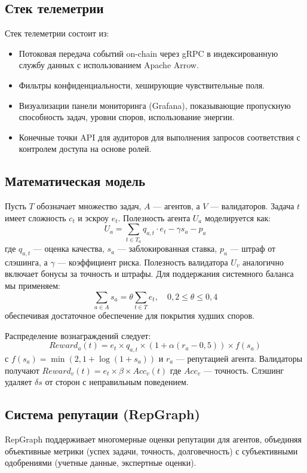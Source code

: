 \documentclass[11pt]{article}
\begin{document}
\subsection{Стек телеметрии}
Стек телеметрии состоит из:
\begin{itemize}[noitemsep]
  \item Потоковая передача событий on-chain через gRPC в индексированную службу данных с использованием Apache Arrow.
  \item Фильтры конфиденциальности, хеширующие чувствительные поля.
  \item Визуализации панели мониторинга (Grafana), показывающие пропускную способность задач, уровни споров, использование энергии.
  \item Конечные точки API для аудиторов для выполнения запросов соответствия с контролем доступа на основе ролей.
\end{itemize}

\subsection{Математическая модель}
Пусть $T$ обозначает множество задач, $A$ — агентов, а $V$ — валидаторов. Задача $t$ имеет сложность $c_t$ и эскроу $e_t$. Полезность агента $U_a$ моделируется как:
\begin{equation}
U_a = \sum_{t \in T_a} q_{a,t}\cdot e_t - \gamma s_a - p_a\label{eq:agent-utility}
\end{equation}
где $q_{a,t}$ — оценка качества, $s_a$ — заблокированная ставка, $p_a$ — штраф от слэшинга, а $\gamma$ — коэффициент риска. Полезность валидатора $U_v$ аналогично включает бонусы за точность и штрафы. Для поддержания системного баланса мы применяем:
\begin{equation}
\sum_{a \in A} s_a = \theta \sum_{t \in T} e_t,\quad 0,2 \leq \theta \leq 0,4
\end{equation}
обеспечивая достаточное обеспечение для покрытия худших споров.

Распределение вознаграждений следует:
\begin{equation}
Reward_a(t) = e_t \times q_{a,t} \times \left(1 + \alpha (r_a - 0,5)\right) \times f(s_a)
\end{equation}
с $f(s_a) = \min(2, 1 + \log(1+s_a))$ и $r_a$ — репутацией агента. Валидаторы получают $Reward_v(t) = e_t \times \beta \times Acc_v(t)$ где $Acc_v$ — точность. Слэшинг удаляет $\delta s$ от сторон с неправильным поведением.

\subsection{Система репутации (RepGraph)}
\label{sec:reputation}
RepGraph поддерживает многомерные оценки репутации для агентов, объединяя объективные метрики (успех задачи, точность, долговечность) с субъективными одобрениями (учетные данные, экспертные оценки).
\end{document}

